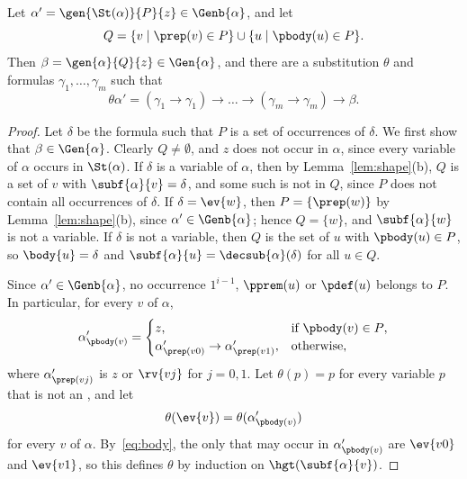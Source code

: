 \begin{lemma}\label{lem:key}
Let $\alpha'=\gen{\St(\alpha)}{P}{z}\in\Genb{\alpha}$, and let
\[
Q=\{v\mid\prep(v)\in P\}\cup\{u\mid\pbody(u)\in P\}.
\]
Then $\beta=\gen{\alpha}{Q}{z}\in\Gen{\alpha}$, and there are a substitution $\theta$ and formulas
$\gamma_1,\dots,\gamma_m$ such that
\[
\theta\alpha'=(\gamma_1\to\gamma_1)\to\dots\to(\gamma_m\to\gamma_m)\to\beta .
\]
\end{lemma}
\begin{proof}
Let $\delta$ be the formula such that $P$ is a set of occurrences of
$\delta$. We first show that $\beta\in\Gen{\alpha}$. Clearly $Q\ne\emptyset$, and $z$ does not occur in $\alpha$,
since every variable of $\alpha$ occurs in $\St(\alpha)$. If $\delta$ is a
variable of $\alpha$, then by Lemma~\ref{lem:shape}(b), $Q$ is a set of
 $v$ with $\subf{\alpha}{v}=\delta$, and some such  is
not in $Q$, since $P$ does not contain all occurrences of $\delta$. If
$\delta=\ev{w}$, then $P=\{\prep(w)\}$ by Lemma~\ref{lem:shape}(b), since
$\alpha'\in\Genb{\alpha}$; hence $Q=\{w\}$, and $\subf{\alpha}{w}$ is not a
variable. If $\delta$ is not a variable, then
$Q$ is the set of $u$ with $\pbody(u)\in P$, so $\body{u}=\delta$ and
$\subf{\alpha}{u}=\decsub{\alpha}(\delta)$ for all $u\in Q$.

Since $\alpha'\in\Genb{\alpha}$, no occurrence $1^{i-1}$, $\pprem(u)$ or
$\pdef(u)$ belongs to $P$. In particular, for every  $v$ of $\alpha$,
\begin{equation}\label{eq:body}
\alpha'_{\pbody(v)}=
\begin{cases}
z, & \text{if $\pbody(v)\in P$},\\
\alpha'_{\prep(v0)}\to\alpha'_{\prep(v1)}, & \text{otherwise},
\end{cases}
\end{equation}
where $\alpha'_{\prep(vj)}$ is $z$ or $\rv{vj}$ for $j=0,1$. Let
$\theta(p)=p$ for every variable $p$ that is not an , and let
\[
\theta(\ev{v})=\theta(\alpha'_{\pbody(v)})
\]
for every  $v$ of $\alpha$. By~\eqref{eq:body},
the only  that may occur in $\alpha'_{\pbody(v)}$
are $\ev{v0}$ and $\ev{v1}$, so this defines $\theta$ by induction on
$\hgt(\subf{\alpha}{v})$.


\end{proof}
